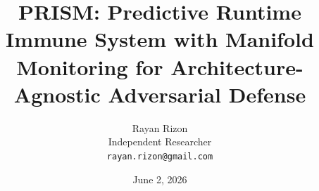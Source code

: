 \documentclass{article}
\title{\textsc{PRISM}: Predictive Runtime Immune System with Manifold Monitoring for
       Architecture-Agnostic Adversarial Defense}
\author{%
  Rayan Rizon\\
  Independent Researcher\\
  \texttt{rayan.rizon@gmail.com}\\
}
\date{June 2, 2026}
\begin{document}
\maketitle

\begin{abstract}
  
\end{abstract}










\appendix

\end{document}
